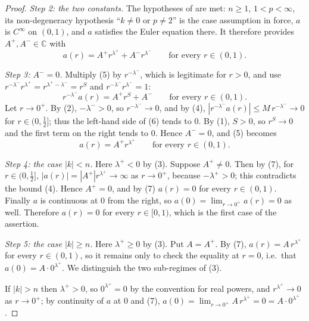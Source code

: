 \begin{proof}
\emph{Step 2: the two constants.}  The hypotheses of
 are met: $n\ge1$, $1<p<\infty$, its non-degeneracy
hypothesis ``$k\neq0$ or $p\neq2$'' is the case assumption in force, $a$ is
$C^\infty$ on $(0,1)$, and $a$ satisfies the Euler equation there.  It
therefore provides $A^{+},A^{-}\in\mathbb{C}$ with
\begin{equation}\tag{5}
  a(r)=A^{+}r^{\lambda^{+}}+A^{-}r^{\lambda^{-}}\qquad\text{for every }r\in(0,1).
\end{equation}

\emph{Step 3: $A^{-}=0$.}  Multiply (5) by $r^{-\lambda^{-}}$, which is
legitimate for $r>0$, and use $r^{-\lambda^{-}}r^{\lambda^{+}}=r^{\lambda^{+}-\lambda^{-}}=r^{S}$
and $r^{-\lambda^{-}}r^{\lambda^{-}}=1$:
\begin{equation}\tag{6}
  r^{-\lambda^{-}}a(r)=A^{+}r^{S}+A^{-}\qquad\text{for every }r\in(0,1).
\end{equation}
Let $r\to0^{+}$.  By (2), $-\lambda^{-}>0$, so $r^{-\lambda^{-}}\to0$, and by
(4), $|r^{-\lambda^{-}}a(r)|\le M\,r^{-\lambda^{-}}\to0$ for $r\in(0,\tfrac12]$;
thus the left-hand side of (6) tends to $0$.  By (1), $S>0$, so
$r^{S}\to0$ and the first term on the right tends to $0$.  Hence $A^{-}=0$, and
(5) becomes
\begin{equation}\tag{7}
  a(r)=A^{+}r^{\lambda^{+}}\qquad\text{for every }r\in(0,1).
\end{equation}

\emph{Step 4: the case $|k|<n$.}  Here $\lambda^{+}<0$ by (3).  Suppose
$A^{+}\neq0$.  Then by (7), for $r\in(0,\tfrac12]$,
$|a(r)|=|A^{+}|r^{\lambda^{+}}\to\infty$ as $r\to0^{+}$, because
$-\lambda^{+}>0$; this contradicts the bound (4).  Hence $A^{+}=0$, and by (7)
$a(r)=0$ for every $r\in(0,1)$.  Finally $a$ is continuous at $0$ from the
right, so $a(0)=\lim_{r\to0^{+}}a(r)=0$ as well.  Therefore $a(r)=0$ for every
$r\in[0,1)$, which is the first case of the assertion.

\emph{Step 5: the case $|k|\ge n$.}  Here $\lambda^{+}\ge0$ by (3).  Put
$A=A^{+}$.  By (7), $a(r)=A\,r^{\lambda^{+}}$ for every $r\in(0,1)$, so it
remains only to check the equality at $r=0$, i.e.\ that
$a(0)=A\cdot0^{\lambda^{+}}$.  We distinguish the two sub-regimes of (3).

If $|k|>n$ then $\lambda^{+}>0$, so $0^{\lambda^{+}}=0$ by the convention for
real powers, and $r^{\lambda^{+}}\to0$ as $r\to0^{+}$; by continuity of $a$ at
$0$ and (7),
$a(0)=\lim_{r\to0^{+}}A\,r^{\lambda^{+}}=0=A\cdot0^{\lambda^{+}}$.


\end{proof}
